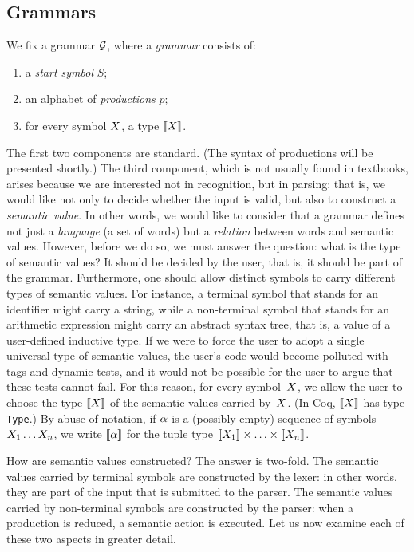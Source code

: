 \documentclass{llncs}
\begin{document}
\subsection{Grammars}

We fix a grammar $\mathcal{G}$, where a \emph{grammar} consists of:
\begin{enumerate}
\item a \emph{start symbol} $S$;
\item an alphabet of \emph{productions} $p$;
\item for every symbol $X$, a type $\llbracket X\rrbracket$.
\end{enumerate}
The first two components are standard. (The syntax of productions will be
presented shortly.)
The third component, which is not usually found in textbooks, arises because
we are interested not in recognition, but in parsing: that is, we would like
not only to decide whether the input is valid, but also to construct a
\emph{semantic value}. In other words, we would like to consider that a
grammar defines not just a \emph{language} (a set of words) but
a \emph{relation} between words and semantic values. However,
before we do so, we must answer the question:
%
what is the type of semantic values? It should be decided by the user, that
is, it should be part of the grammar. Furthermore, one should allow distinct
symbols to carry different types of semantic values. For instance, a terminal
symbol that stands for an identifier might carry a string, while a
non-terminal symbol that stands for an arithmetic expression might carry an
abstract syntax tree, that is, a value of a user-defined inductive type.  If
we were to force the user to adopt a single universal type of semantic values,
the user's code would become polluted with tags and dynamic tests, and it
would not be possible for the user to argue that these tests cannot fail. For
this reason, for every symbol~$X$, we allow the
user to choose the type $\llbracket X\rrbracket$ of the semantic values carried
by~$X$. (In Coq, $\llbracket X\rrbracket$ has type \verb+Type+.) By abuse of notation, if
$\alpha$ is a (possibly empty) sequence of symbols $X_1\ldots X_n$,
we write $\llbracket\alpha\rrbracket$ for the tuple type
$\llbracket X_1\rrbracket\times\ldots\times\llbracket X_n\rrbracket$.

How are semantic values constructed? The answer is two-fold. The semantic
values carried by terminal symbols are constructed by the lexer: in other
words, they are part of the input that is submitted to the parser. The
semantic values carried by non-terminal symbols are constructed by the parser:
when a production is reduced, a semantic action is executed. Let us now
examine each of these two aspects in greater detail.
\end{document}
